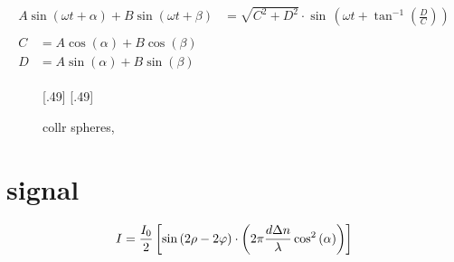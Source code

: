 \begin{align}
\begin{split}
A \sin(\omega t + \alpha) + B \sin(\omega t + \beta) &= \sqrt{C^2 + D^2} \cdot \sin \, \left( \omega t + \tan^{-1} \left( \frac{D}{C} \right) \right)
\end{split}
\\
\begin{split}
C &= A \cos(\alpha)+ B \cos(\beta)\\
D &= A \sin(\alpha)+ B \sin(\beta)
\end{split} \nonumber 
\end{align}
% 
\begin{figure}[!t]
\centering
\def\tikzwidth{0.45*\textwidth}
[.49\textwidth]{
}
[.49\textwidth]{
}
\caption{collr spheres, }
\label{fig:spheres}
\end{figure}
% 
% 
% 
\section{signal}
% 
\begin{align}
I = \frac{I_0}{2} \left[ \sin\left(2\rho - 2\varphi\right) \cdot \left( 2\pi\frac{d \textnormal{$\Delta n$}}{\lambda} \cos^2\left( \alpha \right) \right)  \right]
\end{align}